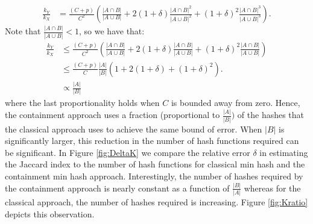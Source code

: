 \documentclass[11pt,reqno]{amsart}
\theoremstyle{remark}
\numberwithin{equation}{section}
\newcommand{\classicX}{X}
\newcommand{\containX}{Y}
\begin{document}
\begin{align}
\frac{ k_\containX}{k_\classicX}
&= \frac{(C+p)}{C^2}\left(\frac{|A\cap B|}{|A\cup B|}+2(1+\delta)\frac{|A\cap B|^2}{|A\cup B|^2}+(1+\delta)^2\frac{|A\cap B|^3}{|A\cup B|^3}\right). \label{eqn:KestOverJest}
\end{align}
Note that $\frac{|A\cap B|}{|A\cup B|} <1$, so we have that:
\begin{align}
\frac{ k_\containX}{k_\classicX} &\leq \frac{(C+p)}{C^2}\left(\frac{|A\cap B|}{|A\cup B|}+2(1+\delta)\frac{|A\cap B|}{|A\cup B|}+(1+\delta)^2\frac{|A\cap B|}{|A\cup B|}\right)\\
&\leq \frac{(C+p)}{C}\frac{|A|}{|B|}\left(1+2(1+\delta)+(1+\delta)^2\right).\\
&\propto \frac{|A|}{|B|} \label{kj/kest}
\end{align}
where the last proportionality holds when $C$ is bounded away from zero.
Hence, the containment approach uses a fraction (proportional to $\frac{|A|}{|B|})$ of the hashes that the classical approach uses to achieve the same bound of error. When $|B|$ is significantly larger, this reduction in the number of hash functions required can be significant. In Figure \ref{fig:DeltaK} we compare the relative error $\delta$ in estimating the Jaccard index to the number of hash functions for classical min hash and the containment min hash approach. Interestingly, the number of hashes required by the containment approach is nearly constant as a function of $\frac{|B|}{|A|}$ whereas for the classical approach, the number of hashes required is increasing. Figure \ref{fig:Kratio} depicts this observation.
\end{document}
